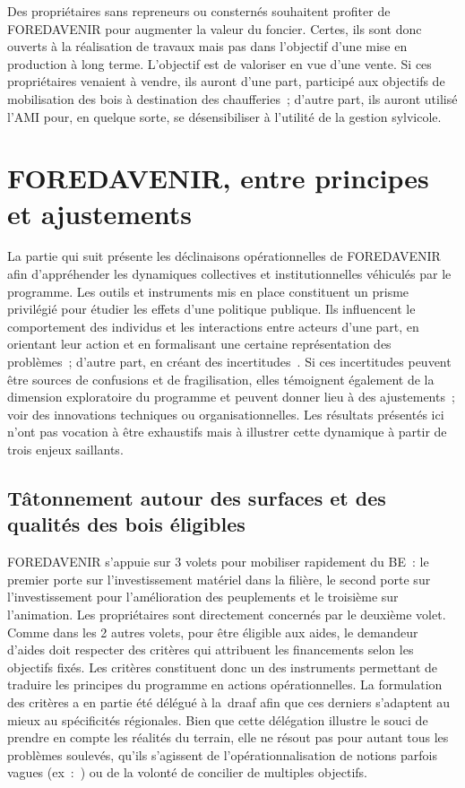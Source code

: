 \documentclass[12pt]{report}
\newcommand\indexp[1]{#1\index{#1}}
\begin{document}
Des propriétaires sans repreneurs ou consternés souhaitent profiter de FOREDAVENIR
pour augmenter la valeur du foncier. Certes, ils sont donc ouverts à la
réalisation de travaux mais pas dans l'objectif d'une mise en production à long
terme. L'objectif est de valoriser en vue d'une vente. Si ces propriétaires
venaient à vendre, ils auront d'une part, participé aux objectifs de mobilisation
des bois à destination des chaufferies~; d'autre part, ils auront utilisé l'AMI
pour, en quelque sorte, se désensibiliser à l'utilité de la gestion sylvicole.

\section{FOREDAVENIR, entre principes et ajustements}

La partie qui suit présente les déclinaisons opérationnelles de FOREDAVENIR afin
d’appréhender les dynamiques collectives et institutionnelles véhiculés par
le programme. Les outils et instruments mis en place constituent un prisme
privilégié pour étudier les effets d’une politique publique.
Ils influencent le comportement des individus et les interactions entre acteurs
d'une part, en orientant leur action et en formalisant une certaine représentation des
problèmes~; d'autre part, en créant des incertitudes~\citep{lascoumes2005_ref116}.
Si ces incertitudes peuvent être sources de confusions et de fragilisation, elles
témoignent également de la dimension exploratoire du programme et peuvent donner
lieu à des ajustements~; voir des innovations techniques ou organisationnelles. Les
résultats présentés ici n'ont pas vocation à être exhaustifs mais à illustrer cette
dynamique à partir de trois enjeux saillants.

\subsection{Tâtonnement autour des surfaces et des qualités des bois éligibles}\label{sec:eli}

\indexp{FOREDAVENIR} s'appuie sur 3 volets pour mobiliser rapidement du BE~:
le premier porte sur
l'investissement matériel dans la filière, le second porte sur l'investissement
pour l'amélioration des peuplements et le troisième sur l'animation. Les
propriétaires sont directement concernés par le deuxième volet. Comme dans les 2 autres
volets, pour être éligible aux aides, le demandeur d'aides doit respecter des
critères qui attribuent les financements selon les objectifs fixés. Les critères constituent
donc un des instruments permettant de traduire les principes du programme en
actions opérationnelles. La formulation des critères a en partie été délégué à
la~\gls{draaf} afin que ces derniers s'adaptent au mieux au spécificités
régionales. Bien que cette délégation illustre le souci de prendre en compte les
réalités du terrain, elle ne résout pas pour autant tous les problèmes soulevés,
qu’ils s’agissent de l’opérationnalisation de notions parfois vagues
(ex~:~) ou de la volonté de concilier de
multiples objectifs.\\
\end{document}
